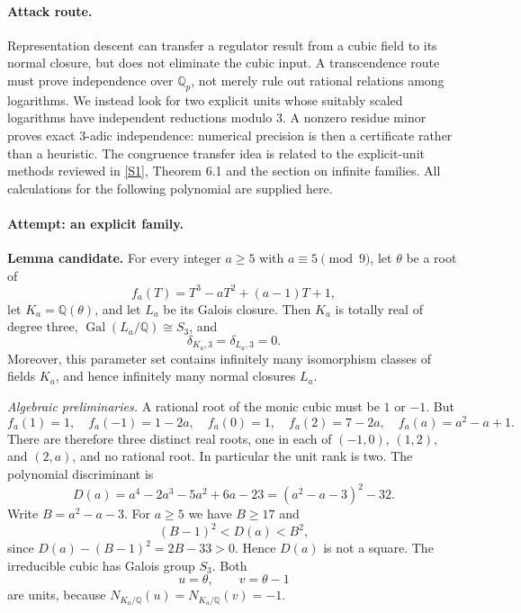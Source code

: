 \documentclass[11pt,a4paper]{article}
\newcommand{\Q}{\mathbb{Q}}
\newcommand{\sref}[2]{\hyperlink{source:#1:#2}{[S#2]}}
\numberwithin{equation}{section}
\begin{document}
\paragraph{Attack route.}
Representation descent can transfer a regulator result from a cubic field
to its normal closure, but does not eliminate the cubic input. A
transcendence route must prove independence over $\Q_p$, not merely rule out
rational relations among logarithms. We instead look for two explicit units
whose suitably scaled logarithms have independent reductions modulo $3$.
A nonzero residue minor proves exact $3$-adic independence: numerical
precision is then a certificate rather than a heuristic. The congruence
transfer idea is related to the explicit-unit methods reviewed in
\sref{156}{1}, Theorem 6.1 and the section on infinite families. All
calculations for the following polynomial are supplied here.

\paragraph{Attempt: an explicit family.}
\textbf{Lemma candidate.} For every integer $a\ge5$ with $a\equiv5\pmod9$,
let $\theta$ be a root of
\begin{equation}\label{eq156-family}
 f_a(T)=T^3-aT^2+(a-1)T+1,
\end{equation}
let $K_a=\Q(\theta)$, and let $L_a$ be its Galois closure. Then $K_a$ is
totally real of degree three, $\operatorname{Gal}(L_a/\Q)\cong S_3$, and
\[
 \delta_{K_a,3}=\delta_{L_a,3}=0.
\]
Moreover, this parameter set contains infinitely many isomorphism classes
of fields $K_a$, and hence infinitely many normal closures $L_a$.

\textit{Algebraic preliminaries.} A rational root of the monic cubic must be
$1$ or $-1$. But
\[
 f_a(1)=1,\quad f_a(-1)=1-2a,\quad f_a(0)=1,\quad
 f_a(2)=7-2a,\quad f_a(a)=a^2-a+1.
\]
There are therefore three distinct real roots, one in each of
$(-1,0)$, $(1,2)$, and $(2,a)$, and no rational root. In particular the
unit rank is two. The polynomial discriminant is
\begin{equation}\label{eq156-discriminant}
 D(a)=a^4-2a^3-5a^2+6a-23=(a^2-a-3)^2-32.
\end{equation}
Write $B=a^2-a-3$. For $a\ge5$ we have $B\ge17$ and
\[
 (B-1)^2<D(a)<B^2,
\]
since $D(a)-(B-1)^2=2B-33>0$. Hence $D(a)$ is not a square. The
irreducible cubic has Galois group $S_3$. Both
\[
 u=\theta,\qquad v=\theta-1
\]
are units, because $N_{K_a/\Q}(u)=N_{K_a/\Q}(v)=-1$.
\end{document}
